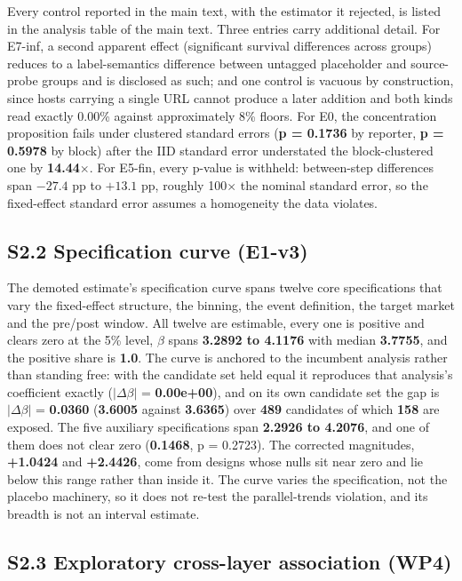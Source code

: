 \documentclass[11pt,a4paper]{article}
\begin{document}
Every control reported in the main text, with the estimator it rejected, is
listed in the analysis table of the main text. Three entries carry additional
detail. For E7-inf, a second apparent effect (significant survival differences
across groups) reduces to a label-semantics difference between untagged
placeholder and source-probe groups and is disclosed as such; and one control is
vacuous by construction, since hosts carrying a single URL cannot produce a later
addition and both kinds read exactly 0.00\% against approximately 8\% floors.
For E0, the concentration proposition fails under clustered standard errors
(\textbf{p = 0.1736} by reporter, \textbf{p = 0.5978} by block) after the IID
standard error understated the block-clustered one by \textbf{14.44$\times$}. For
E5-fin, every p-value is withheld: between-step differences span $-27.4$ pp to
$+13.1$ pp, roughly 100$\times$ the nominal standard error, so the fixed-effect
standard error assumes a homogeneity the data violates.

\subsection*{S2.2 Specification curve (E1-v3)}

The demoted estimate's specification curve spans twelve core specifications that
vary the fixed-effect structure, the binning, the event definition, the target
market and the pre/post window. All twelve are estimable, every one is positive
and clears zero at the 5\% level, $\beta$ spans \textbf{3.2892 to 4.1176} with
median \textbf{3.7755}, and the positive share is \textbf{1.0}. The curve is
anchored to the incumbent analysis rather than standing free: with the candidate
set held equal it reproduces that analysis's coefficient exactly
($|\Delta\beta|$ = \textbf{0.00e+00}), and on its own candidate set the gap is
$|\Delta\beta|$ = \textbf{0.0360} (\textbf{3.6005} against \textbf{3.6365}) over
\textbf{489} candidates of which \textbf{158} are exposed. The five auxiliary
specifications span \textbf{2.2926 to 4.2076}, and one of them does not clear
zero (\textbf{0.1468}, p = 0.2723). The corrected magnitudes, \textbf{+1.0424}
and \textbf{+2.4426}, come from designs whose nulls sit near zero and lie below
this range rather than inside it. The curve varies the specification, not the
placebo machinery, so it does not re-test the parallel-trends violation, and its
breadth is not an interval estimate.

\subsection*{S2.3 Exploratory cross-layer association (WP4)}
\end{document}
